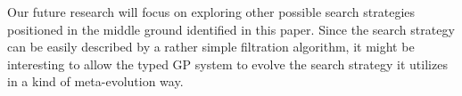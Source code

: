 \documentclass[conference]{IEEEtran}
\newcommand{\red}[1]{{\color{red} #1}}
\begin{document}
Our future research will focus on exploring other possible search strategies positioned in the middle ground 
identified in this paper. Since the search strategy can be easily described by a rather simple filtration algorithm, it might be
interesting to allow the typed GP system to evolve the search strategy it 
utilizes in a kind of meta-evolution way. 









\end{document}
